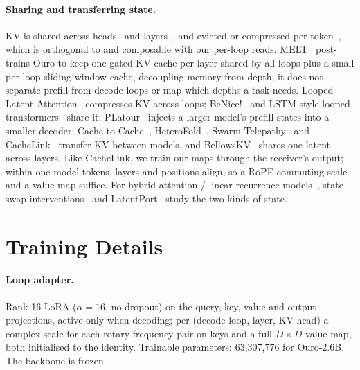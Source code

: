 \documentclass[11pt]{article}
\begin{document}
\paragraph{Sharing and transferring state.} KV is shared across heads~\citep{mqa,gqa} and
layers~\citep{cla,mlkv}, and evicted or compressed per token~\citep{streamingllm,h2o,snapkv,pyramidkv}, which is
orthogonal to and composable with our per-loop reads. MELT~\citep{melt} post-trains Ouro to keep one gated KV cache per layer shared by
all loops plus a small per-loop sliding-window cache, decoupling memory from depth; it does not separate prefill from decode loops or map which depths a task needs.
Looped Latent Attention~\citep{lla} compresses KV across loops;
BeNice!~\citep{benice} and LSTM-style looped transformers~\citep{lstmloop} share it; PLatour~\citep{platour} injects a larger model's prefill states into a smaller decoder; Cache-to-Cache~\citep{c2c},
HeteroFold~\citep{heterofold}, Swarm Telepathy~\citep{swat} and CacheLink~\citep{cachelink} transfer KV between models,
and BellowsKV~\citep{bellows} shares one latent across layers. Like CacheLink, we train our maps through the receiver's
output; within one model tokens, layers and positions align, so a RoPE-commuting scale and a value map suffice. For hybrid attention / linear-recurrence
models~\citep{gdn,hymba}, state-swap interventions~\citep{afendulev} and LatentPort~\citep{latentport} study the two
kinds of state.


\section{Training Details}
\label{app:training}

\paragraph{Loop adapter.} Rank-16 LoRA ($\alpha=16$, no dropout) on the query, key, value and output projections, active
only when decoding; per (decode loop, layer, KV head) a complex scale for each rotary frequency pair on keys and a full
$D\times D$ value map, both initialised to the identity. Trainable parameters: 63,307,776 for Ouro-2.6B. The backbone is
frozen.
\end{document}

